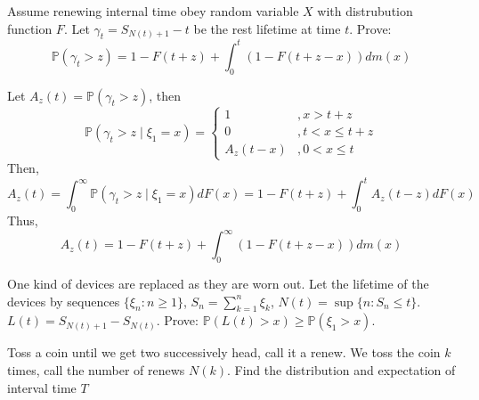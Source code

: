 \documentclass{ctexart}
\begin{document}
\begin{problem}\label{pro:3}
  Assume renewing internal time obey random variable \(X\) with distrubution function \(F\).
  Let \(\gamma_t=S_{N(t) + 1}-t\) be the rest lifetime at time \(t\).
  Prove: \[
    \mathbb{P}(\gamma_t > z)=1-F(t + z) + \int_{0}^t(1-F(t + z -x))d m(x)
  \]
\end{problem}
\begin{solution}
  Let \(A_z(t)=\mathbb{P}(\gamma_t > z)\), then \[
    \mathbb{P}(\gamma_t > z \mid \xi_1=x)=\begin{cases}
      1        & ,x > t + z         \\
      0        & , t < x \leq t + z \\
      A_z(t-x) & , 0 < x \leq t
    \end{cases}
  \]
  Then,
  \[
    A_z(t)=\int_{0}^\infty \mathbb{P}(\gamma_t > z \mid \xi_1=x)d F(x)=1-F(t + z) + \int_{0}^tA_z(t-z)dF(x)
  \]
  Thus, \[
    A_z(t)=1-F(t + z) + \int_{0}^\infty(1-F(t + z -x))dm(x)
  \]
\end{solution}

\begin{problem}\label{pro:4}
  One kind of devices are replaced as they are worn out. Let the lifetime of the devices by sequences
  \(\{\xi_n:n \geq 1\}\), \(S_n=\sum_{k=1}^{n} \xi_k\), \(N(t)=\sup \{n: S_n \leq t\}\). \(L(t)=S_{N(t) + 1}-S_{N(t)}\).
  Prove: \(\mathbb{P}(L(t)> x) \geq \mathbb{P}(\xi_1 > x)\).
\end{problem}

\begin{problem}\label{pro:5}
  Toss a coin until we get two successively head, call it a renew.
  We toss the coin \(k\) times, call the number of renews \(N(k)\).
  Find the distribution and expectation of interval time \(T\)
\end{problem}
\end{document}
